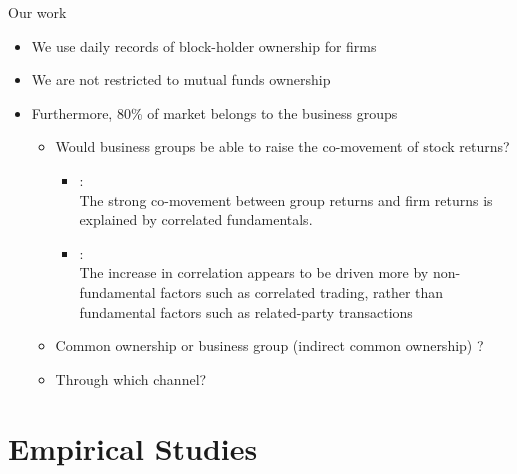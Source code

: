 \documentclass{beamer}
\begin{document}
	\begin{frame}{Our work}
		\begin{itemize}
			\item 
			We use daily records of block-holder ownership for firms
			\item We are not restricted to mutual funds ownership
			\item Furthermore, 80\% of market belongs to the business groups
			\begin{itemize}
				\item Would business groups be able to raise the co-movement of stock returns?
				\begin{itemize}
					\tiny
					\item \cite{cho2015stock}: \\
					The strong co-movement between group returns and
					firm returns is explained by correlated fundamentals. 
					\item \cite{kim2015stock}:\\
					The increase in correlation appears to be driven
					more by non-fundamental factors such as correlated trading, rather
					than fundamental factors such as related-party transactions
				\end{itemize}
			\item Common ownership or business group (indirect common ownership) ?
			\item  Through which channel?
			\end{itemize}
			
		\end{itemize}
	\end{frame}
	
	\normalsize

	
	
	\section{Empirical Studies}
\end{document}

